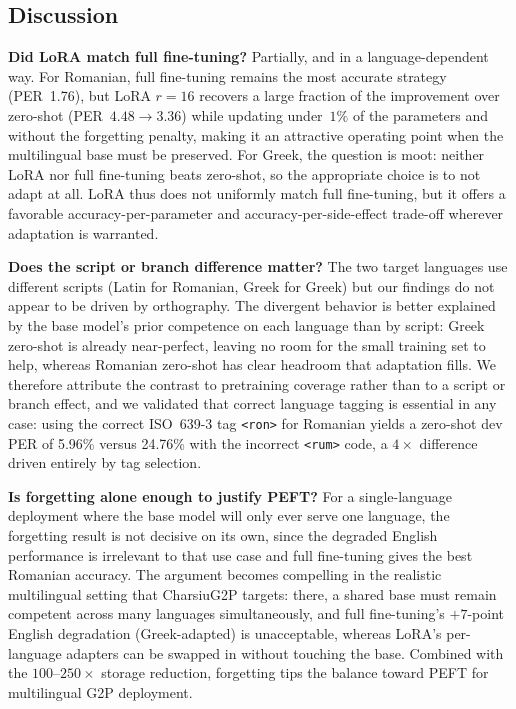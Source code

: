 \documentclass[conference]{IEEEtran}
\begin{document}
\subsection{Discussion}

\textbf{Did LoRA match full fine-tuning?} Partially, and in a language-dependent way. For Romanian, full fine-tuning remains the most accurate strategy (PER~1.76), but LoRA $r{=}16$ recovers a large fraction of the improvement over zero-shot (PER~$4.48\rightarrow3.36$) while updating under~$1\%$ of the parameters and without the forgetting penalty, making it an attractive operating point when the multilingual base must be preserved. For Greek, the question is moot: neither LoRA nor full fine-tuning beats zero-shot, so the appropriate choice is to not adapt at all. LoRA thus does not uniformly match full fine-tuning, but it offers a favorable accuracy-per-parameter and accuracy-per-side-effect trade-off wherever adaptation is warranted.

\textbf{Does the script or branch difference matter?} The two target languages use different scripts (Latin for Romanian, Greek for Greek) but our findings do not appear to be driven by orthography. The divergent behavior is better explained by the base model's prior competence on each language than by script: Greek zero-shot is already near-perfect, leaving no room for the small training set to help, whereas Romanian zero-shot has clear headroom that adaptation fills. We therefore attribute the contrast to pretraining coverage rather than to a script or branch effect, and we validated that correct language tagging is essential in any case: using the correct ISO~639-3 tag \texttt{<ron>} for Romanian yields a zero-shot dev PER of 5.96\% versus 24.76\% with the incorrect \texttt{<rum>} code, a $4\times$ difference driven entirely by tag selection.

\textbf{Is forgetting alone enough to justify PEFT?} For a single-language deployment where the base model will only ever serve one language, the forgetting result is not decisive on its own, since the degraded English performance is irrelevant to that use case and full fine-tuning gives the best Romanian accuracy. The argument becomes compelling in the realistic multilingual setting that CharsiuG2P targets: there, a shared base must remain competent across many languages simultaneously, and full fine-tuning's $+7$-point English degradation (Greek-adapted) is unacceptable, whereas LoRA's per-language adapters can be swapped in without touching the base. Combined with the $100$--$250\times$ storage reduction, forgetting tips the balance toward PEFT for multilingual G2P deployment.
\end{document}
